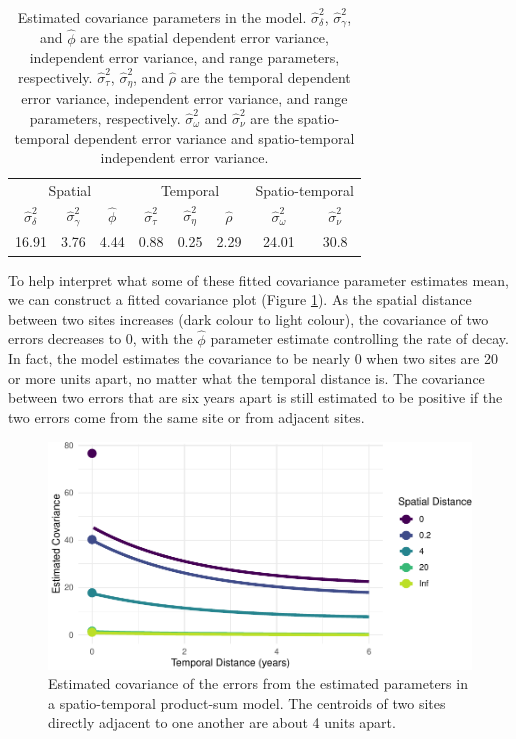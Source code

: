 \documentclass[]{interact}
\theoremstyle{plain}%
\theoremstyle{definition}
\theoremstyle{remark}
\begin{document}
\begin{table}[H]

\caption{\label{tab:paramest}Estimated covariance parameters in the model. $\hat{\sigma}^2_{\delta}$, $\hat{\sigma}^2_{\gamma}$, and $\hat{\phi}$ are the spatial dependent error variance, independent error variance, and range parameters, respectively. $\hat{\sigma}^2_{\tau}$, $\hat{\sigma}^2_{\eta}$, and $\hat{\rho}$ are the temporal dependent error variance, independent error variance, and range parameters, respectively. $\hat{\sigma}^2_{\omega}$ and $\hat{\sigma}^2_{\nu}$ are the spatio-temporal dependent error variance and spatio-temporal independent error variance.}
\centering
\begin{tabular}[t]{cccccccc}
\toprule
\multicolumn{3}{c}{Spatial} & \multicolumn{3}{c}{Temporal} & \multicolumn{2}{c}{Spatio-temporal} \\
\cmidrule(l{3pt}r{3pt}){1-3} \cmidrule(l{3pt}r{3pt}){4-6} \cmidrule(l{3pt}r{3pt}){7-8}
$\hat{\sigma}^2_{\delta}$ & $\hat{\sigma}^2_{\gamma}$ & $\hat{\phi}$ & $\hat{\sigma}^2_{\tau}$ & $\hat{\sigma}^2_{\eta}$ & $\hat{\rho}$ & $\hat{\sigma}^2_{\omega}$ & $\hat{\sigma}^2_{\nu}$\\
\midrule
16.91 & 3.76 & 4.44 & 0.88 & 0.25 & 2.29 & 24.01 & 30.8\\
\bottomrule
\end{tabular}
\end{table}

To help interpret what some of these fitted covariance parameter
estimates mean, we can construct a fitted covariance plot (Figure
\ref{fig:covplot}). As the spatial distance between two sites increases
(dark colour to light colour), the covariance of two errors decreases to
0, with the \(\hat{\phi}\) parameter estimate controlling the rate of
decay. In fact, the model estimates the covariance to be nearly 0 when
two sites are 20 or more units apart, no matter what the temporal
distance is. The covariance between two errors that are six years apart
is still estimated to be positive if the two errors come from the same
site or from adjacent sites.

\begin{figure}
\centering
\includegraphics{fpspatiotemp_manu_files/figure-latex/covplot-1.pdf}
\caption{\label{fig:covplot} Estimated covariance of the errors from the
estimated parameters in a spatio-temporal product-sum model. The
centroids of two sites directly adjacent to one another are about 4
units apart.}
\end{figure}
\end{document}
